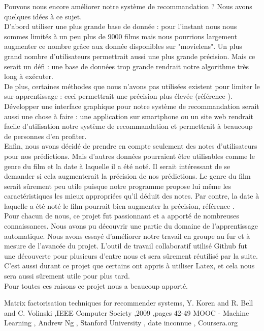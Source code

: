 \documentclass[a4paper,10pt]{article}
\begin{document}
Pouvons nous encore améliorer notre système de recommandation ? Nous avons quelques idées à ce sujet.\\
D'abord utiliser une plus grande base de donnée : pour l'instant nous nous sommes limités à un peu plus de 9000 films mais nous pourrions largement augmenter ce nombre grâce aux donnée disponibles 
sur "movielens". Un plus grand nombre d'utilisateurs permettrait aussi une plus grande précision. Mais ce serait un défi : une base de données trop grande rendrait notre algorithme très long à exécuter.\\
De plus, certaines méthodes que nous n'avons pas utilisées existent pour limiter le sur-apprentissage : ceci permettrait une précision plus élevée (référence \cite{mooc}).\\
Développer une interface graphique pour notre système de recommandation serait aussi une chose à faire : une application sur smartphone ou un site web rendrait facile d'utilisation notre système de recommandation et permettrait à beaucoup de personnes d'en profiter.\\
Enfin, nous avons décidé de prendre en compte seulement des notes d'utilisateurs pour nos prédictions. Mais d'autres données pourraient être utilisables comme le genre du film et la date à laquelle il a été noté. Il serait intéressant de se demander si cela augmenterait la précision de nos prédictions. Le genre du film serait sûrement peu utile puisque notre programme propose lui même les caractéristiques les mieux appropriées qu'il déduit des notes. Par contre, la date à laquelle a été noté le film pourrait bien augmenter la précision, référence \cite{matrix}.\\

Pour chacun de nous, ce projet fut passionnant et a apporté de nombreuses connaissances. Nous avons pu découvrir une partie du domaine de l'apprentissage automatique. Nous avons essayé d'améliorer notre travail en groupe au fur et à mesure de l'avancée du projet. L'outil de travail collaboratif utilisé Github fut une découverte pour plusieurs d'entre nous et sera sûrement réutilisé par la suite. C'est aussi durant ce projet que certains ont appris à utiliser Latex, et cela nous sera aussi sûrement utile pour plus tard.\\
Pour toutes ces raisons ce projet nous a beaucoup apporté.

\newpage 
 
\begin{thebibliography}{99} 
 Matrix factorisation techniques for recommender systems, Y. Koren and R. Bell and C. Volinski ,IEEE Computer Society ,2009 ,pages 42-49 
 MOOC - Machine Learning , Andrew Ng , Stanford University , date inconnue , Coursera.org
\end{thebibliography}
\end{document}
